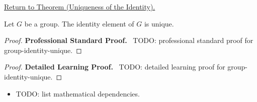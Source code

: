 \newpage
{}
\label{prf:group-identity-unique}

\begin{remark*}[Return]
\hyperref[prop:group-identity-unique]{Return to Theorem (Uniqueness of the Identity).}
\end{remark*}

\begin{theorem*}
Let $G$ be a group. The identity element of $G$ is unique.
\end{theorem*}

\begin{proof}
\textbf{Professional Standard Proof.}~
TODO: professional standard proof for group-identity-unique.
\end{proof}

\begin{proof}
\textbf{Detailed Learning Proof.}~
TODO: detailed learning proof for group-identity-unique.
\end{proof}

\begin{remark*}
\end{remark*}

\begin{dependencies}
\begin{itemize}
  \item TODO: list mathematical dependencies.
\end{itemize}
\end{dependencies}

\clearpage
